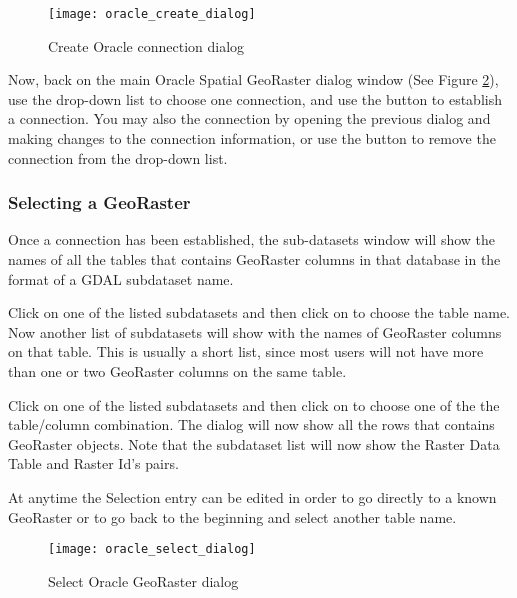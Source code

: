 \begin{figure}[ht]
   \begin{center}
   \caption{Create Oracle connection dialog \nixcaption}\label{fig:oracle_create}\smallskip
   \texttt{[image: oracle\_create\_dialog]}
\end{center}
\end{figure}

Now, back on the main Oracle Spatial GeoRaster dialog window (See Figure \ref{fig:oracle_select}), use the 
drop-down list to choose one connection, and use the  button to establish a connection. You 
may also  the connection by opening the previous dialog and making changes to the connection 
information, or use the  button to remove the connection from the drop-down list.

\subsubsection{Selecting a GeoRaster}

Once a connection has been established, the sub-datasets window will show the names of all the tables that 
contains GeoRaster columns in that database in the format of a GDAL subdataset name.

Click on one of the listed subdatasets and then click on  to choose the table name. Now another 
list of subdatasets will show with the names of GeoRaster columns on that table. This is usually a short list, 
since most users will not have more than one or two GeoRaster columns on the same table.

Click on one of the listed subdatasets and then click on  to choose one of the the table/column 
combination. The dialog will now show all the rows that contains GeoRaster objects. Note that the subdataset 
list will now show the Raster Data Table and Raster Id's pairs.

At anytime the Selection entry can be edited in order to go directly to a known GeoRaster or to go back to the 
beginning and select another table name.

\begin{figure}[ht]
   \begin{center}
   \caption{Select Oracle GeoRaster dialog \nixcaption}\label{fig:oracle_select}\smallskip
   \texttt{[image: oracle\_select\_dialog]}
\end{center}
\end{figure}

